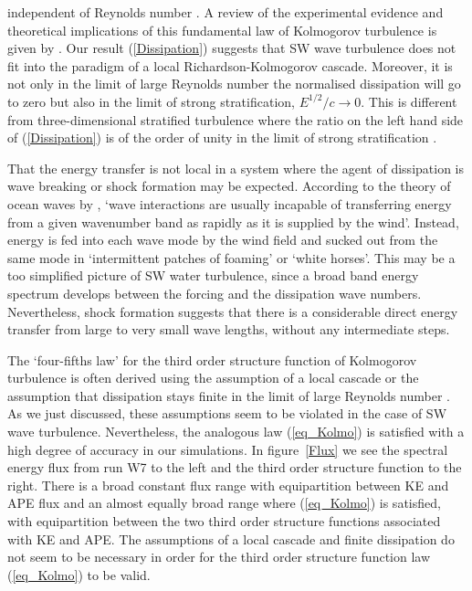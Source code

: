 independent of Reynolds number \cite[]{Pope, TennekesLumley}. A review of the
experimental evidence and theoretical implications of this fundamental law of
Kolmogorov turbulence is given by \cite{Vassilicos2015}. Our result
(\ref{Dissipation}) suggests that SW wave turbulence does not fit into the
paradigm of a local Richardson-Kolmogorov cascade. Moreover, it is not only in
the limit of large Reynolds number the normalised dissipation will go to zero
but also in the limit of strong stratification, $ E^{1/2}/c \rightarrow 0 $.
This is different from three-dimensional stratified turbulence where the ratio
on the left hand side of (\ref{Dissipation}) is of the order of unity in the
limit of strong stratification \cite[]{Lindborg2006, Brethouwer2007}.

That the energy transfer is not local in a system where the agent of dissipation is wave breaking or shock formation may be expected. According to the theory of ocean waves by  \cite{Phillips}, 
`wave interactions are usually incapable of transferring energy from a given wavenumber
band as rapidly as it is supplied by the wind'. Instead, energy is fed into each wave mode by the
wind field and sucked out from the same mode in `intermittent patches of foaming'
or `white horses'.  This may be a too simplified picture of SW water turbulence, since a broad band energy spectrum develops between the forcing and the dissipation wave numbers. 
Nevertheless,  shock formation suggests that there is a considerable direct energy transfer from large to very small wave lengths, without any intermediate steps. 


The `four-fifths law' for the third order structure function of Kolmogorov
turbulence is often derived using the assumption of a local cascade
\cite[]{Vassilicos2015} or the assumption that dissipation stays finite in the
limit of large Reynolds number \cite[]{Frisch}. As we just discussed, these
assumptions seem to be violated in the case of SW wave turbulence.
Nevertheless, the analogous law (\ref{eq_Kolmo}) is satisfied with a high degree of accuracy in our simulations. In
figure~\ref{Flux} we see the spectral energy flux from run W7 to the left and
the third order structure function to the right. There is a broad constant flux
range with equipartition between KE and APE flux and an almost equally broad
range where (\ref{eq_Kolmo}) is satisfied, with equipartition between the two
third order structure functions associated with KE and APE. The assumptions of
a local cascade and finite dissipation do not seem to be necessary in order for
the third order structure function law (\ref{eq_Kolmo}) to be valid.



